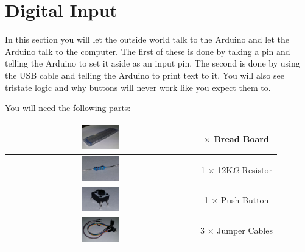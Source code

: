 \section{Digital Input}

In this section you will let the outside world talk to the Arduino
and let the Arduino talk to the computer.
The first of these is done by taking a pin and telling the Arduino
to set it aside as an input pin.
The second is done by using the USB cable and telling the Arduino
to print text to it. 
You will also see tristate logic and why buttons will never work
like you expect them to.

You will need the following parts:

\setlength{\tabcolsep}{0pt}
\begin{center}
\begin{tabular}{|c| c |}
\hline
    \includegraphics[align=c,width=0.2\textwidth]{./Graphics/breadboard}
    & 
    \begin{minipage}[t]{0.2\textwidth}
        \centering
        1 $\times$ Bread Board 
    \end{minipage}\\ \hline
    \includegraphics[align=c,width=0.2\textwidth]{./Graphics/12k_resistor} 
    & 1 $\times$ 12K$\Omega$ Resistor \\ \hline
    \includegraphics[align=c,width=0.2\textwidth]{./Graphics/push_button}
    & 1 $\times$ Push Button\\ \hline
    \includegraphics[align=c,width=0.2\textwidth]{./Graphics/jumper_cables}
    & 3 $\times$ Jumper Cables \\ \hline
  \end{tabular}
\end{center}

